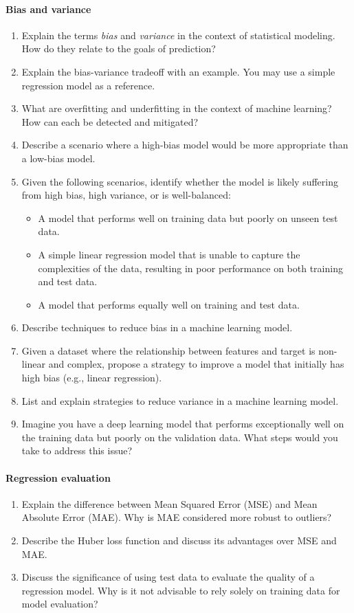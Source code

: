 \paragraph*{Bias and variance}
\begin{enumerate}
    \item Explain the terms \emph{bias} and \emph{variance} in the context of statistical modeling. How do they relate to the goals of prediction?
    \item Explain the bias-variance tradeoff with an example. You may use a simple regression model as a reference.
    \item What are overfitting and underfitting in the context of machine learning? How can each be detected and mitigated?
    \item Describe a scenario where a high-bias model would be more appropriate than a low-bias model.
    \item Given the following scenarios, identify whether the model is likely suffering from high bias, high variance, or is well-balanced:
	\begin{itemize}
	  \item A model that performs well on training data but poorly on unseen test data.
	  \item A simple linear regression model that is unable to capture the complexities of the data, resulting in poor performance on both training and test data.
	  \item A model that performs equally well on training and test data.
	\end{itemize}
    \item Describe techniques to reduce bias in a machine learning model.
    \item Given a dataset where the relationship between features and target is non-linear and complex, propose a strategy to improve a model that initially has high bias (e.g., linear regression).
    \item List and explain strategies to reduce variance in a machine learning model.
    \item Imagine you have a deep learning model that performs exceptionally well on the training data but poorly on the validation data. What steps would you take to address this issue?
\end{enumerate}
\paragraph*{Regression evaluation}
\begin{enumerate}
    \item Explain the difference between Mean Squared Error (MSE) and Mean Absolute Error (MAE). Why is MAE considered more robust to outliers?
    \item Describe the Huber loss function and discuss its advantages over MSE and MAE.
    \item Discuss the significance of using test data to evaluate the quality of a regression model. Why is it not advisable to rely solely on training data for model evaluation?
\end{enumerate}
